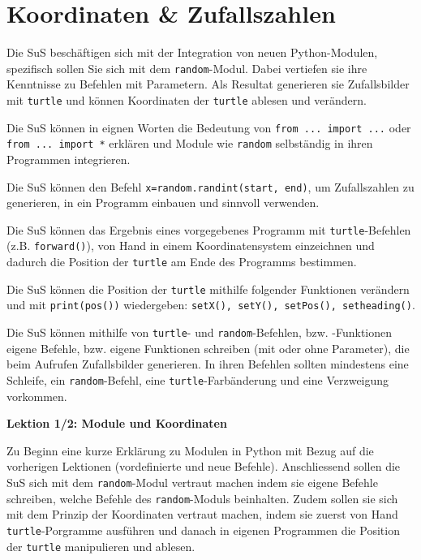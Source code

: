 \section{Koordinaten \& Zufallszahlen}
\begin{myExBox}
Die SuS beschäftigen sich mit der Integration von neuen Python-Modulen, spezifisch sollen Sie sich mit dem \lstinline|random|-Modul. Dabei vertiefen sie ihre Kenntnisse zu Befehlen mit Parametern. Als Resultat generieren sie Zufallsbilder mit \lstinline|turtle| und können Koordinaten der \lstinline|turtle| ablesen und verändern.


\begin{todolist}
    \item Die SuS können in eignen Worten die Bedeutung von \lstinline|from ... import ...| oder \lstinline|from ... import *| erklären und Module wie \lstinline|random| selbständig in ihren Programmen integrieren.
    \item Die SuS können den Befehl \lstinline|x=random.randint(start, end)|, um Zufallszahlen zu generieren, in ein Programm einbauen und sinnvoll verwenden.
    \item Die SuS können das Ergebnis eines vorgegebenes Programm mit \lstinline|turtle|-Befehlen (z.B. \lstinline|forward()|), von Hand in einem Koordinatensystem einzeichnen und dadurch die Position der \lstinline|turtle| am Ende des Programms bestimmen.
    \item Die SuS können die Position der \lstinline|turtle| mithilfe folgender Funktionen verändern und mit \lstinline|print(pos())| wiedergeben: \lstinline|setX(), setY(), setPos(), setheading()|. 
    \item Die SuS können mithilfe von \lstinline|turtle|- und \lstinline|random|-Befehlen, bzw. -Funktionen eigene Befehle, bzw. eigene Funktionen schreiben (mit oder ohne Parameter), die beim Aufrufen Zufallsbilder generieren. In ihren Befehlen sollten mindestens eine Schleife, ein \lstinline|random|-Befehl, eine \lstinline|turtle|-Farbänderung und eine Verzweigung vorkommen.
\end{todolist}

\textbf{Lektion 1/2: Module und Koordinaten}

Zu Beginn eine kurze Erklärung zu Modulen in Python mit Bezug auf die vorherigen Lektionen (vordefinierte und neue Befehle). Anschliessend sollen die SuS sich mit dem \lstinline|random|-Modul vertraut machen indem sie eigene Befehle schreiben, welche Befehle des \lstinline|random|-Moduls beinhalten. Zudem sollen sie sich mit dem Prinzip der Koordinaten vertraut machen, indem sie zuerst von Hand \lstinline|turtle|-Porgramme ausführen und danach in eigenen Programmen die Position der \lstinline|turtle| manipulieren und ablesen.


\end{myExBox}
